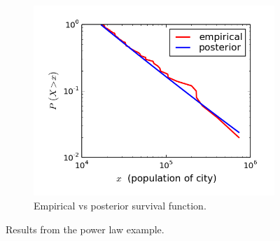 \documentclass[12pt]{article}
\begin{document}
\begin{figure}
\begin{subfigure}[t]{0.49\textwidth}
    \end{subfigure}%
    ~ 
    \begin{subfigure}[t]{0.49\textwidth}
        \centering
        \includegraphics[trim=0 0.6cm 0 0, clip, width=1\textwidth]{Pareto-survival-function.png}
        \caption{Empirical vs posterior survival function.}
    \end{subfigure}
    \vspace{.5em}
    \caption{Results from the power law example.}
    \label{figure:Pareto}
\end{figure}
\end{document}
